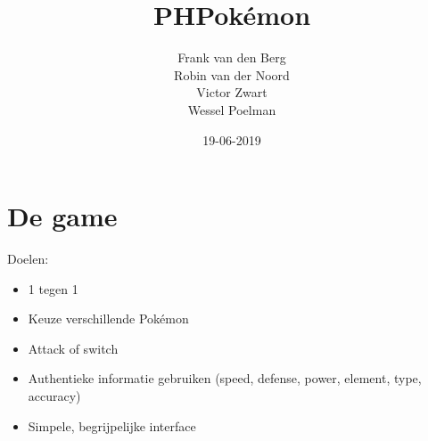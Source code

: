 \documentclass{beamer}
\title{PHPokémon}
\author{Frank van den Berg \\ Robin van der Noord \\ Victor Zwart \\ Wessel Poelman}
\date{19-06-2019}
\begin{document}

\begin{frame}
	\maketitle %
\end{frame}

\section{De game} %

\begin{frame}{Doelen:}
	\begin{itemize}
		\item 1 tegen 1 
		\item Keuze verschillende Pokémon
		\item Attack of switch
		\item Authentieke informatie gebruiken {\tiny(speed, defense, power, element, type, accuracy)}
		\item Simpele, begrijpelijke interface
	\end{itemize}
\end{frame}

\end{document}
